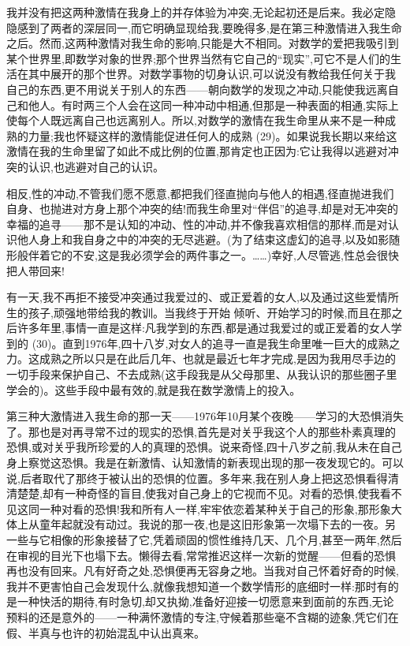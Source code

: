 我并没有把这两种激情在我身上的并存体验为冲突,无论起初还是后来。我必定隐隐感到了两者的深层同一,而它明确显现给我,要晚得多,是在第三种激情进入我生命之后。然而,这两种激情对我生命的影响,只能是大不相同。对数学的爱把我吸引到某个世界里,即数学对象的世界;那个世界当然有它自己的“现实”,可它不是人们的生活在其中展开的那个世界。对数学事物的切身认识,可以说没有教给我任何关于我自己的东西,更不用说关于别人的东西——朝向数学的发现之冲动,只能使我远离自己和他人。有时两三个人会在这同一种冲动中相通,但那是一种表面的相通,实际上使每个人既远离自己也远离别人。所以,对数学的激情在我生命里从来不是一种成熟的力量;我也怀疑这样的激情能促进任何人的成熟 (29)。如果说我长期以来给这激情在我的生命里留了如此不成比例的位置,那肯定也正因为:它让我得以逃避对冲突的认识,也逃避对自己的认识。

相反,性的冲动,不管我们愿不愿意,都把我们径直抛向与他人的相遇,径直抛进我们自身、也抛进对方身上那个冲突的结!而我生命里对“伴侣”的追寻,却是对无冲突的幸福的追寻——那不是认知的冲动、性的冲动,并不像我喜欢相信的那样,而是对认识他人身上和我自身之中的冲突的无尽逃避。(为了结束这虚幻的追寻,以及如影随形般伴着它的不安,这是我必须学会的两件事之一。……)幸好,人尽管逃,性总会很快把人带回来!

有一天,我不再拒不接受冲突通过我爱过的、或正爱着的女人,以及通过这些爱情所生的孩子,顽强地带给我的教训。当我终于开始%
倾听、开始学习的时候,而且在那之后许多年里,事情一直是这样:凡我学到的东西,都是通过我爱过的或正爱着的女人学到的 (30)。直到1976年,四十八岁,对女人的追寻一直是我生命里唯一巨大的成熟之力。这成熟之所以只是在此后几年、也就是最近七年才完成,是因为我用尽手边的一切手段来保护自己、不去成熟(这手段我是从父母那里、从我认识的那些圈子里学会的)。这些手段中最有效的,就是我在数学激情上的投入。

第三种大激情进入我生命的那一天——1976年10月某个夜晚——学习的大恐惧消失了。那也是对再寻常不过的现实的恐惧,首先是对关乎我这个人的那些朴素真理的恐惧,或对关乎我所珍爱的人的真理的恐惧。说来奇怪,四十八岁之前,我从未在自己身上察觉这恐惧。我是在新激情、认知激情的新表现出现的那一夜发现它的。可以说,后者取代了那终于被认出的恐惧的位置。多年来,我在别人身上把这恐惧看得清清楚楚,却有一种奇怪的盲目,使我对自己身上的它视而不见。对看的恐惧,使我看不见这同一种对看的恐惧!我和所有人一样,牢牢依恋着某种关于自己的形象,那形象大体上从童年起就没有动过。我说的那一夜,也是这旧形象第一次塌下去的一夜。另一些与它相像的形象接替了它,凭着顽固的惯性维持几天、几个月,甚至一两年,然后在审视的目光下也塌下去。懒得去看,常常推迟这样一次新的觉醒——但看的恐惧再也没有回来。凡有好奇之处,恐惧便再无容身之地。当我对自己怀着好奇的时候,我并不更害怕自己会发现什么,就像我想知道一个数学情形的底细时一样:那时有的是一种快活的期待,有时急切,却又执拗,准备好迎接一切愿意来到面前的东西,无论预料的还是意外的——一种满怀激情的专注,守候着那些毫不含糊的迹象,凭它们在假、半真与也许的初始混乱中认出真来。

